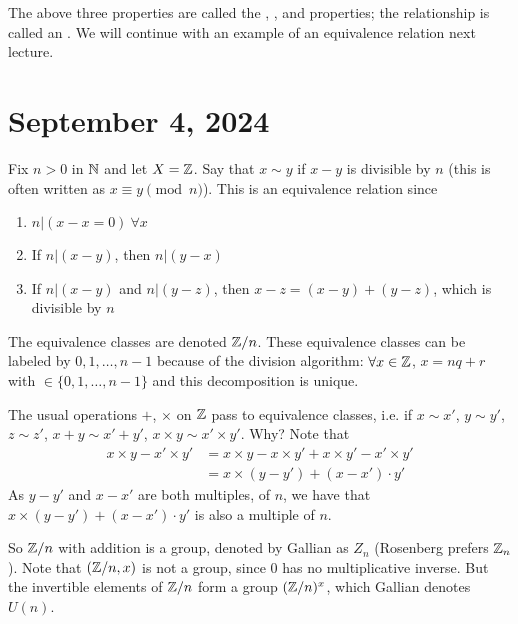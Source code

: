 \documentclass[12pt]{scrartcl}
\begin{document}
The above three properties are called the , , and  properties; the relationship is called an . We will continue with an example of an equivalence relation next lecture.

\section{September 4, 2024}

\begin{example}
    Fix $n > 0$ in $\mathbb N$ and let $X = \mathbb Z$. Say that $x \sim y$ if $x-y$ is divisible by $n$ (this is often written as $x \equiv y \pmod n$). This is an equivalence relation since
        \begin{enumerate}
            \item $n|(x-x=0) \ \forall x$
            \item If $n|(x-y)$, then $n|(y-x)$
            \item If $n|(x-y)$ and $n|(y-z)$, then $x-z = (x-y) + (y-z)$, which is divisible by $n$
        \end{enumerate}
\end{example}

The equivalence classes are denoted $\mathbb Z / n$. These equivalence classes can be labeled by $0, 1, \ldots, n-1$ because of the division algorithm: $\forall x \in \mathbb Z$, $x = nq + r$ with $ \in \{0, 1, \ldots, n-1\}$ and this decomposition is unique.

\begin{fact}
    The usual operations $+$, $\times$ on $\mathbb Z$ pass to equivalence classes, i.e. if $x \sim x'$, $y \sim y'$, $z \sim z'$, $x+y \sim x' + y'$, $x \times y \sim x' \times y'$. Why? Note that
        \begin{align*}
            x \times y - x' \times y' &= x \times y - x \times y' + x \times y' - x' \times y' \\
            &= x \times (y-y') + (x-x') \cdot y'
        \end{align*}
    As $y-y'$ and $x-x'$ are both multiples, of $n$, we have that $x \times (y-y') + (x-x') \cdot y'$ is also a multiple of $n$.
\end{fact}

So $\mathbb Z / n$ with addition is a group, denoted by Gallian as $Z_n$ (Rosenberg prefers $\mathbb Z_n$). Note that $(\mathbb Z / n, x)$ is not a group, since $0$ has no multiplicative inverse. But the invertible elements of $\mathbb Z / n$ form a group $(\mathbb Z / n)^x$, which Gallian denotes $U(n)$. \\
\end{document}
